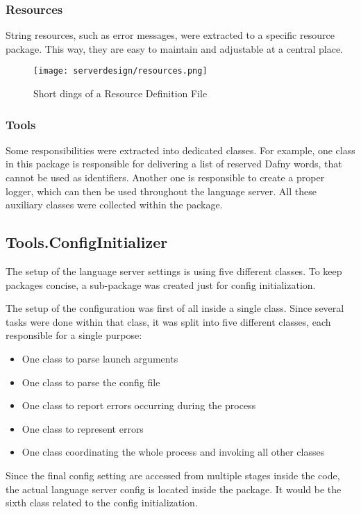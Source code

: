 
\subsubsection{Resources}
String resources, such as error messages, were extracted to a specific resource package.
This way, they are easy to maintain and adjustable at a central place.

\begin{figure}[H]
    \centering
    \texttt{[image: serverdesign/resources.png]}
    \caption{Short dings of a Resource Definition File}
    \label{fig:server_resources}
\end{figure}

\subsubsection{Tools}
Some responsibilities were extracted into dedicated classes.
For example, one class in this package is responsible for delivering a list of reserved Dafny words, that cannot be used as identifiers.
Another one is responsible to create a proper logger, which can then be used throughout the language server.
All these auxiliary classes were collected within the  package.\\

\subsection{Tools.ConfigInitializer}
The setup of the language server settings is using five different classes.
To keep packages concise, a sub-package was created just for config initialization.

The setup of the configuration was first of all inside a single class.
Since several tasks were done within that class, it was split into five different classes, each responsible for a single purpose:
\begin{itemize}
    \item One class to parse launch arguments
    \item One class to parse the config file
    \item One class to report errors occurring during the process
    \item One class to represent errors
    \item One class coordinating the whole process and invoking all other classes
\end{itemize}
Since the final config setting are accessed from multiple stages inside the code, the actual language server config is located inside the  package.
It would be the sixth class related to the config initialization.


